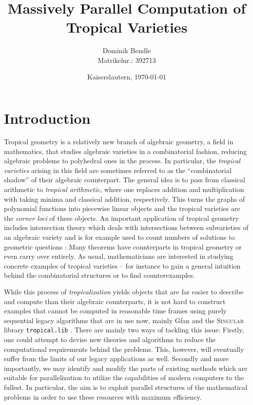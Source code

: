 \documentclass[
  paper=a4,
  titlepage,
  bibliography=totoc,
  pagesize=pdftex
]{scrartcl}
\title{Massively Parallel Computation of Tropical Varieties}
\author{Dominik Bendle\\{\small Matrikelnr.: 392713}}
\date{Kaiserslautern, \today}
\numberwithin{figure}{section}
\numberwithin{equation}{section}
\numberwithin{table}{section}
\theoremstyle{definition}
\numberwithin{definition}{section}
\begin{document}

\pagestyle{empty}
\maketitle

\clearpage\null\clearpage
\pagestyle{plain}
\tableofcontents
\newpage
\listoffigures
\listoftables
\lstlistoflistings
\newpage

\pagestyle{headings}

\section{Introduction}

Tropical geometry is a relatively new branch of algebraic geometry, a field in
mathematics, that studies algebraic varieties in a combinatorial fashion, reducing
algebraic problems to polyhedral ones in the process. In particular, the \emph{tropical
varieties} arising in this field are sometimes referred to as the \enquote{combinatorial
shadow} of their algebraic counterpart. The general idea is to pass from classical
arithmetic to \emph{tropical arithmetic}, where one replaces addition and multiplication
with taking minima and classical addition, respectively. This turns the graphs of
polynomial functions into piecewise linear objects and the tropical varieties are the
\emph{corner loci} of these objects. An important application of tropical geometry
includes intersection theory which deals with intersections between subvarieties of an
algebraic variety and is for example used to count numbers of solutions to geometric
questions \cite{mikhEnum}: Many theorems have counterparts in tropical geometry or even
carry over entirely. As usual, mathematicians are interested in studying concrete examples
of tropical varieties -- for instance to gain a general intuition behind the combinatorial
structures or to find counterexamples.

While this process of \emph{tropicalization} yields objects that are far easier to
describe and compute than their algebraic counterparts, it is not hard to construct
examples that cannot be computed in reasonable time frames using purely sequential legacy
algorithms that are in use now, mainly Gfan \cite{gfan} and the \textsc{Singular} library
\texttt{tropical.lib} \cite{tropLib}. There are mainly two ways of tackling this issue:
Firstly, one could attempt to devise new theories and algorithms to reduce the
computational requirements behind the problems. This, however, will eventually suffer from
the limits of our legacy applications as well. Secondly and more importantly, we may
identify and modify the parts of existing methods which are suitable for parallelization
to utilize the capabilities of modern computers to the fullest. In particular, the aim is
to exploit parallel structures of the mathematical problems in order to use these
resources with maximum efficiency.
\end{document}
